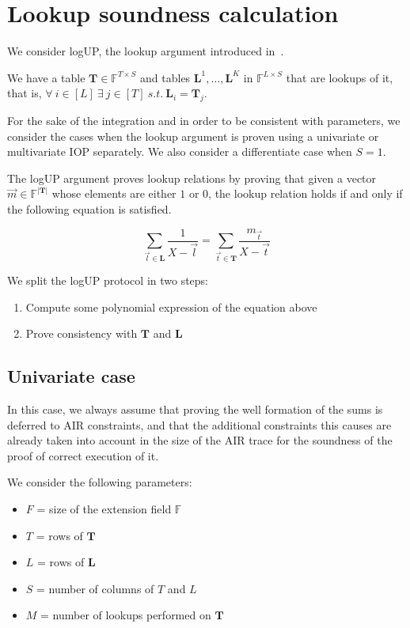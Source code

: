 \newpage
\section{Lookup soundness calculation}

We consider logUP, the lookup argument introduced in~\cite{habock2022logup}. 

We have a table $\mathbf{T}\in\mathbb{F}^{T\times S}$ and tables $\mathbf{L}^1, \ldots, \mathbf{L}^K$ in $\mathbb{F}^{L\times S}$ that are lookups of it, that is, $\forall \ i\in[L] \ \exists \ j\in[T] \ s.t. \ \mathbf L_i=\mathbf T_j$.

For the sake of the integration and in order to be consistent with parameters, we consider the cases when the lookup argument is proven using a univariate or multivariate IOP separately. We also consider a differentiate case when $S=1$.

The logUP argument proves lookup relations by proving that given a vector $\vec m\in\mathbb{F}^{|\mathbf T|}$ whose elements are either $1$ or $0$, the lookup relation holds if and only if the following equation is satisfied. 

$$\sum_{\vec l\in\mathbf{L}} \frac{1}{X-  \vec l}=\sum_{\vec t \in \mathbf{T}} \frac{m_{\vec t}}{X- \vec t}$$


We split the logUP protocol in two steps:

\begin{enumerate}
	\item Compute some polynomial expression of the equation above
	\item Prove consistency with $\mathbf T$ and $\mathbf L$	
\end{enumerate}



\subsection{Univariate case}

In this case, we always assume that proving the well formation of the sums is deferred to AIR constraints, and that the additional constraints this causes are already taken into account in the size of the AIR trace for the soundness of the proof of correct execution of it.

We consider the following parameters:
\begin{itemize}
	\item $F$ = size of the extension field $\mathbb{F}$
	\item $T$ = rows of $\mathbf{T}$
	\item $L$ = rows of $\mathbf{L}$
	\item $S$ = number of columns of $T$ and $L$
	\item $M$ = number of lookups performed on $\mathbf{T}$
\end{itemize}


